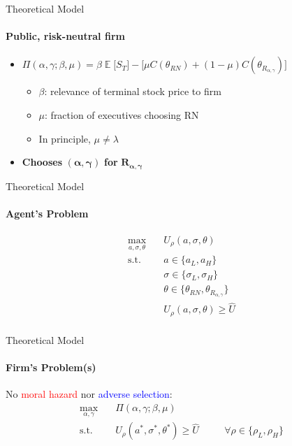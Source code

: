 \documentclass[compress]{beamer}
\DeclareMathOperator{\EX}{\mathbb{E}}%
\begin{document}
\begin{frame}{Theoretical Model}
    \framesubtitle{Public, risk-neutral firm}
    \begin{itemize}
        \item $ \Pi (\alpha, \gamma; \beta, \mu) = \beta \EX \Big[ S_T \Big] - \Big[ \mu C(\theta_{RN}) + (1-\mu) C(\theta_{R_{\alpha, \gamma}}) \Big]$ 
        \begin{itemize}
            \item $\beta$: relevance of terminal stock price to firm
            \item $\mu$: fraction of executives choosing RN
            \item In principle, $\mu \ne \lambda$
        \end{itemize}
        \vspace*{10pt}
        \item \textbf{Chooses} $\boldsymbol{(\alpha, \gamma)}$ \textbf{for} $\boldsymbol{R_{\alpha, \gamma}}$
    \end{itemize}
\end{frame}

\begin{frame}{Theoretical Model}
    \framesubtitle{Agent's Problem}

    \begin{equation*}
        \begin{aligned}
        \max_{a, \sigma, \theta} \quad & U_\rho (a, \sigma, \theta) \\
        \textrm{s.t.}       \quad & a \in \{ a_L, a_H \} \\
                            \quad & \sigma \in \{ \sigma_L, \sigma_H \} \\
                            \quad & \theta \in \{\theta_{RN}, \theta_{R_{\alpha, \gamma}} \} \\
                            \quad & U_\rho(a, \sigma, \theta) \ge \hat{U}  \\
        \end{aligned}
    \end{equation*}
\end{frame}

\begin{frame}{Theoretical Model}
    \framesubtitle{Firm's Problem(s)}
    No \textcolor{red}{moral hazard} nor \textcolor{blue}{adverse selection}: \\

    \begin{equation*}
        \begin{alignedat}{2}
            \max_{\alpha, \gamma} \quad & \Pi (\alpha, \gamma; \beta, \mu) \\
            \textrm{s.t.}       \quad & U_{\rho}(a^*, \sigma^*, \theta^*) \ge \hat{U} & \quad & \forall \rho \in \{ \rho_L, \rho_H \}\\
        \end{alignedat}
    \end{equation*}

\end{frame}
\end{document}
